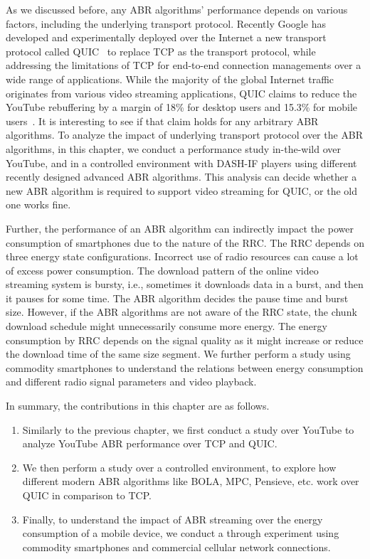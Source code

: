 As we discussed before, any \ac{ABR} algorithms' performance depends on various factors, including the underlying transport protocol. 
Recently Google has developed and experimentally deployed over the Internet a new transport protocol called \ac{QUIC}~\cite{langley2017quic} to replace \ac{TCP} as the transport protocol, while addressing the limitations of \ac{TCP} for end-to-end connection managements over a wide range of applications. While the majority of the global Internet traffic originates from various video streaming applications, \ac{QUIC} claims to reduce the YouTube rebuffering by a margin of 18\% for desktop users and 15.3\% for mobile users~\cite{langley2017quic}.  It is interesting to see if that claim holds for any arbitrary \ac{ABR} algorithms. To analyze the impact of underlying transport protocol over the \ac{ABR} algorithms, in this chapter, we conduct a performance study in-the-wild over YouTube, and in a controlled environment with \ac{DASH-IF} players using different recently designed advanced \ac{ABR} algorithms. This analysis can decide whether a new \ac{ABR} algorithm is required to support video streaming for \ac{QUIC}, or the old one works fine.

Further, the performance of an \ac{ABR} algorithm can indirectly impact the power consumption of smartphones due to the nature of the \ac{RRC}. The \ac{RRC} depends on three energy state configurations. Incorrect use of radio resources can cause a lot of excess power consumption. The download pattern of the online video streaming system is bursty, i.e., sometimes it downloads data in a burst, and then it pauses for some time. The \ac{ABR} algorithm decides the pause time and burst size. However, if the \ac{ABR} algorithms are not aware of the \ac{RRC} state, the chunk download schedule might unnecessarily consume more energy. The energy consumption by \ac{RRC} depends on the signal quality as it might increase or reduce the download time of the same size segment. We further perform a study using commodity smartphones to understand the relations between energy consumption and different radio signal parameters and video playback. 

In summary, the contributions in this chapter are as follows. 
\begin{enumerate}
	\item Similarly to the previous chapter, we first conduct a study over YouTube to analyze YouTube \ac{ABR} performance over \ac{TCP} and \ac{QUIC}. 
	\item We then perform a study over a controlled environment, to explore how different modern \ac{ABR} algorithms like BOLA, MPC, Pensieve, etc. work over \ac{QUIC} in comparison to \ac{TCP}. 
	\item Finally, to understand the impact of \ac{ABR} streaming over the energy consumption of a mobile device, we conduct a through experiment using commodity smartphones and commercial cellular network connections. 
\end{enumerate}

